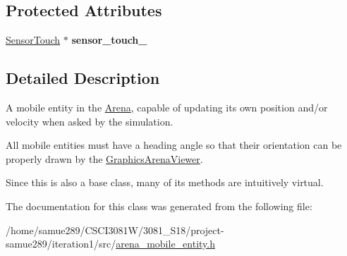\subsection*{Protected Attributes}
\begin{DoxyCompactItemize}
\item 
\hyperlink{classSensorTouch}{Sensor\+Touch} $\ast$ {\bfseries sensor\+\_\+touch\+\_\+}\hypertarget{classArenaMobileEntity_a260fd3fba196ee9ab56f9f2ce6ab4a21}{}\label{classArenaMobileEntity_a260fd3fba196ee9ab56f9f2ce6ab4a21}

\end{DoxyCompactItemize}


\subsection{Detailed Description}
A mobile entity in the \hyperlink{classArena}{Arena}, capable of updating its own position and/or velocity when asked by the simulation. 

All mobile entities must have a heading angle so that their orientation can be properly drawn by the \hyperlink{classGraphicsArenaViewer}{Graphics\+Arena\+Viewer}.

Since this is also a base class, many of its methods are intuitively {\ttfamily virtual}. 

The documentation for this class was generated from the following file\+:\begin{DoxyCompactItemize}
\item 
/home/samue289/\+C\+S\+C\+I3081\+W/3081\+\_\+\+S18/project-\/samue289/iteration1/src/\hyperlink{arena__mobile__entity_8h}{arena\+\_\+mobile\+\_\+entity.\+h}\end{DoxyCompactItemize}
